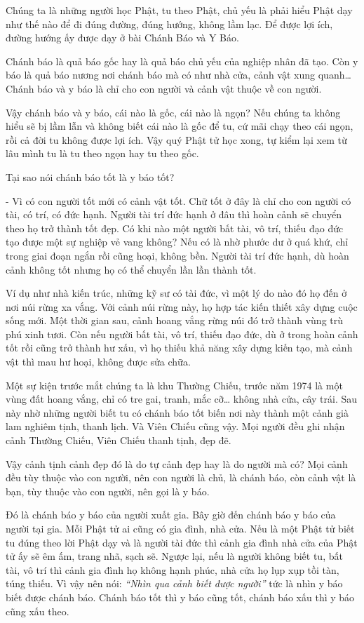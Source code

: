 \documentclass[
  12pt,
  oneside]{book}
\begin{document}
Chúng ta là những người học Phật, tu theo Phật, chủ yếu là phải hiểu Phật dạy như thế nào để đi đúng đường, đúng hướng, không lầm lạc. Để được lợi ích, đường hướng ấy được dạy ở bài Chánh Báo và Y Báo.

Chánh báo là quả báo gốc hay là quả báo chủ yếu của nghiệp nhân đã tạo. Còn y báo là quả báo nương nơi chánh báo mà có như nhà cửa, cảnh vật xung quanh\ldots{} Chánh báo và y báo là chỉ cho con người và cảnh vật thuộc về con người.

Vậy chánh báo và y báo, cái nào là gốc, cái nào là ngọn? Nếu chúng ta không hiểu sẽ bị lầm lẫn và không biết cái nào là gốc để tu, cứ mãi chạy theo cái ngọn, rồi cả đời tu không được lợi ích. Vậy quý Phật tử học xong, tự kiểm lại xem từ lâu mình tu là tu theo ngọn hay tu theo gốc.

Tại sao nói chánh báo tốt là y báo tốt?

- Vì có con người tốt mới có cảnh vật tốt. Chữ tốt ở đây là chỉ cho con người có tài, có trí, có đức hạnh. Người tài trí đức hạnh ở đâu thì hoàn cảnh sẽ chuyển theo họ trở thành tốt đẹp. Có khi nào một người bất tài, vô trí, thiếu đạo đức tạo được một sự nghiệp vẻ vang không? Nếu có là nhờ phước dư ở quá khứ, chỉ trong giai đoạn ngắn rồi cũng hoại, không bền. Người tài trí đức hạnh, dù hoàn cảnh không tốt nhưng họ có thể chuyển lần lần thành tốt.

Ví dụ như nhà kiến trúc, những kỹ sư có tài đức, vì một lý do nào đó họ đến ở nơi núi rừng xa vắng. Với cảnh núi rừng này, họ hợp tác kiến thiết xây dựng cuộc sống mới. Một thời gian sau, cảnh hoang vắng rừng núi đó trở thành vùng trù phú xinh tươi. Còn nếu người bất tài, vô trí, thiếu đạo đức, dù ở trong hoàn cảnh tốt rồi cũng trở thành hư xấu, vì họ thiếu khả năng xây dựng kiến tạo, mà cảnh vật thì mau hư hoại, không được sửa chữa.

Một sự kiện trước mắt chúng ta là khu Thường Chiếu, trước năm 1974 là một vùng đất hoang vắng, chỉ có tre gai, tranh, mắc cỡ\ldots{} không nhà cửa, cây trái. Sau này nhờ những người biết tu có chánh báo tốt biến nơi này thành một cảnh già lam nghiêm tịnh, thanh lịch. Và Viên Chiếu cũng vậy. Mọi người đều ghi nhận cảnh Thường Chiếu, Viên Chiếu thanh tịnh, đẹp đẽ.

Vậy cảnh tịnh cảnh đẹp đó là do tự cảnh đẹp hay là do người mà có? Mọi cảnh đều tùy thuộc vào con người, nên con người là chủ, là chánh báo, còn cảnh vật là bạn, tùy thuộc vào con người, nên gọi là y báo.

Đó là chánh báo y báo của người xuất gia. Bây giờ đến chánh báo y báo của người tại gia. Mỗi Phật tử ai cũng có gia đình, nhà cửa. Nếu là một Phật tử biết tu đúng theo lời Phật dạy và là người tài đức thì cảnh gia đình nhà cửa của Phật tử ấy sẽ êm ấm, trang nhã, sạch sẽ. Ngược lại, nếu là người không biết tu, bất tài, vô trí thì cảnh gia đình họ không hạnh phúc, nhà cửa họ lụp xụp tồi tàn, túng thiếu. Vì vậy nên nói: \emph{``Nhìn qua cảnh biết được người''} tức là nhìn y báo biết được chánh báo. Chánh báo tốt thì y báo cũng tốt, chánh báo xấu thì y báo cũng xấu theo.
\end{document}
